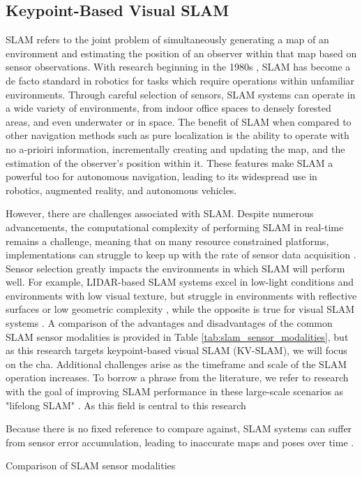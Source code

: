 \subsection{Keypoint-Based Visual SLAM}

SLAM refers to the joint problem of simultaneously generating a map of an environment and estimating the position of an observer within that map based on sensor observations. With research beginning in the 1980s \cite{smithEstimatingUncertainSpatial1988}, SLAM has become a de facto standard in robotics for tasks which require operations within unfamiliar environments. Through careful selection of sensors, SLAM systems can operate in a wide variety of environments, from indoor office spaces to densely forested areas, and even underwater or in space. The benefit of SLAM when compared to other navigation methods such as pure localization is the ability to operate with no a-prioiri information, incrementally creating and updating the map, and the estimation of the observer's position within it. These features make SLAM a powerful too for autonomous navigation, leading to its widespread use in robotics, augmented reality, and autonomous vehicles.

However, there are challenges associated with SLAM. Despite numerous advancements, the computational complexity of performing SLAM in real-time remains a challenge, meaning that on many resource constrained platforms, implementations can struggle to keep up with the rate of sensor data acquisition \cite{semenovaQuantitativeAnalysisSystem2022}. Sensor selection greatly impacts the environments in which SLAM will perform well. For example, LIDAR-based SLAM systems excel in low-light conditions and environments with low visual texture, but struggle in environments with reflective surfaces or low geometric complexity \cite{khanComparativeSurveyLiDARSLAM2021}, while the opposite is true for visual SLAM systems \cite{camposORBSLAM3AccurateOpenSource2021a}. A comparison of the advantages and disadvantages of the common SLAM sensor modalities is provided in Table \ref{tab:slam_sensor_modalities}, but as this research targets keypoint-based visual SLAM (KV-SLAM), we will focus on the cha. Additional challenges arise as the timeframe and scale of the SLAM operation increases. To borrow a phrase from the literature, we refer to research with the goal of improving SLAM performance in these large-scale scenarios as "lifelong SLAM" \cite{shiAreWeReady2020}. As this field is central to this research

Because there is no fixed reference to compare against, SLAM systems can suffer from sensor error accumulation, leading to inaccurate maps and poses over time \cite{cadenaPresentFutureSimultaneous2016}.

\begin{table}[ht!]
    \centering
    \caption{Comparison of SLAM sensor modalities}
    \label{tab:slam_sensor_modalities}
\end{table}